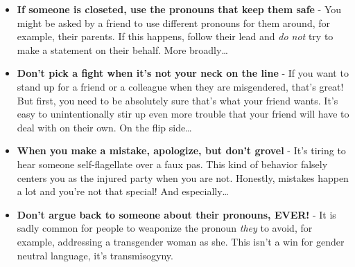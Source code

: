 \documentclass[12pt]{article}
\begin{document}
\begin{itemize}
\item \textbf{If someone is closeted, use the pronouns that keep them safe} - You might be asked by a friend to use different pronouns for them around, for example, their parents. If this happens, follow their lead and \emph{do not} try to make a statement on their behalf. More broadly\ldots

\item \textbf{Don't pick a fight when it's not your neck on the line} - If you want to stand up for a friend or a colleague when they are misgendered, that's great! But first, you need to be absolutely	sure that's what your friend wants. It's easy to unintentionally stir up even more trouble that your friend will have to deal with on their own. On the flip side\ldots

\item \textbf{When you make a mistake, apologize, but don't grovel} - It's tiring to hear someone self-flagellate over a faux pas. This kind of behavior falsely centers you as the injured party when you are not. Honestly, mistakes happen a lot and you're not that special! And especially\ldots

\item \textbf{Don't argue back to someone about their pronouns, EVER!} - It is sadly common for people to weaponize the pronoun \emph{they} to avoid, for example, addressing a transgender woman as she. This isn't a win for gender neutral language, it's transmisogyny.

\end{itemize}

\vfill
\end{document}
